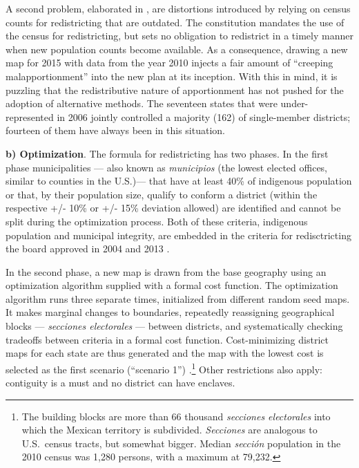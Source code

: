 \documentclass[letter,12pt]{article}
\begin{document}
A second problem, elaborated in \citep{magar.etalBiasMultiParty2015}, are distortions introduced by relying on census counts for redistricting that are outdated. The constitution mandates the use of the census for redistricting, but sets no obligation to redistrict in a timely manner when new population counts become available. As a consequence, drawing a new map for 2015 with data from the year 2010 injects a fair amount of ``creeping malapportionment'' into the new plan at its inception. With this in mind, it is puzzling that the redistributive nature of apportionment has not pushed for the adoption of alternative methods. The seventeen states that were under-represented in 2006 jointly controlled a majority (162) of single-member districts; fourteen of them have always been in this situation. 

\textbf{b) Optimization}. The formula for redistricting has two phases. In the first phase municipalities --- also known as \emph{municipios} (the lowest elected offices, similar to counties in the U.S.)---  that have at least 40\% of indigenous population or that, by their population size, qualify to conform a district (within the respective +/- 10\% or  +/- 15\% deviation allowed) are identified and cannot be split during the optimization process. Both of these criteria, indigenous population and municipal integrity, are embedded in the criteria for redisctricting the board approved in 2004 and 2013 \citep{acuerdo.ife.2004,acuerdo.ife.2013}. 


In the second phase, a new map is drawn from the base geography using an optimization algorithm supplied with a formal cost function. The optimization algorithm runs three separate times, initialized from different random seed maps. It makes marginal changes to boundaries, repeatedly reassigning geographical blocks --- \emph{secciones electorales} --- between districts, and systematically checking tradeoffs between criteria in a formal cost function. Cost-minimizing district maps for each state are thus generated and the map with the lowest cost is selected as the first scenario (``scenario 1'') \citep{trelles.mtz.tesisItam.2007}.\footnote{The building blocks are more than 66 thousand \emph{secciones electorales} into which the Mexican territory is subdivided. \emph{Secciones} are analogous to U.S.\ census tracts, but somewhat bigger. Median \emph{secci\'on} population in the 2010 census was 1,280 persons, with a maximum at 79,232.} Other restrictions also apply: contiguity is a must and no district can have enclaves.  
\end{document}
